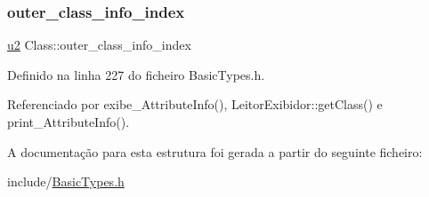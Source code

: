 \subsubsection{\texorpdfstring{outer\+\_\+class\+\_\+info\+\_\+index}{outer\_class\_info\_index}}
{\footnotesize\ttfamily \hyperlink{BasicTypes_8h_a732cde1300aafb73b0ea6c2558a7a54f}{u2} Class\+::outer\+\_\+class\+\_\+info\+\_\+index}



Definido na linha 227 do ficheiro Basic\+Types.\+h.



Referenciado por exibe\+\_\+\+Attribute\+Info(), Leitor\+Exibidor\+::get\+Class() e print\+\_\+\+Attribute\+Info().



A documentação para esta estrutura foi gerada a partir do seguinte ficheiro\+:\begin{DoxyCompactItemize}
\item 
include/\hyperlink{BasicTypes_8h}{Basic\+Types.\+h}\end{DoxyCompactItemize}
